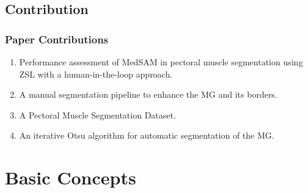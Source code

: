 \documentclass{beamer}
\begin{document}
\subsection{Contribution}


\begin{frame}
  \frametitle{Paper Contributions}
  \begin{enumerate}
    \item Performance assessment of \ac{MedSAM} in pectoral muscle segmentation using \ac{ZSL} with a human-in-the-loop approach.
    \item A manual segmentation pipeline to enhance the \ac{MG} and its borders.
    \item A Pectoral Muscle Segmentation Dataset.
    \item An iterative Otsu algorithm for automatic segmentation of the \ac{MG}.
  \end{enumerate}
\end{frame}
\section{Basic Concepts}
\end{document}
